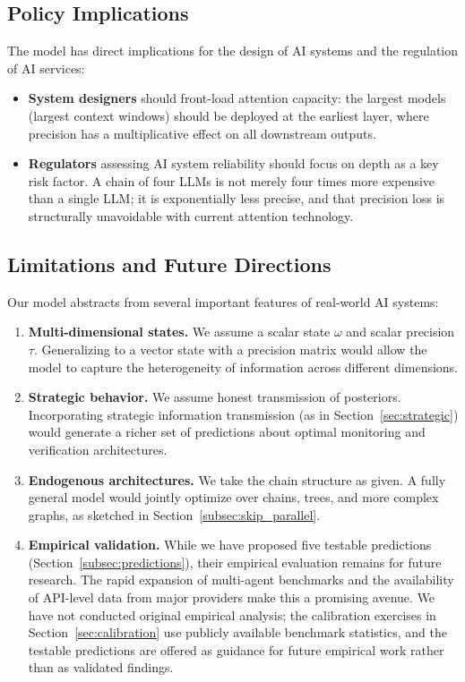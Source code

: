 \subsection{Policy Implications}

The model has direct implications for the design of AI systems and the regulation of AI services:

\begin{itemize}
\item \textbf{System designers} should front-load attention capacity: the largest models (largest context windows) should be deployed at the earliest layer, where precision has a multiplicative effect on all downstream outputs.
\item \textbf{Regulators} assessing AI system reliability should focus on depth as a key risk factor. A chain of four LLMs is not merely four times more expensive than a single LLM; it is exponentially less precise, and that precision loss is structurally unavoidable with current attention technology.
\end{itemize}

\subsection{Limitations and Future Directions}

Our model abstracts from several important features of real-world AI systems:

\begin{enumerate}
\item \textbf{Multi-dimensional states.} We assume a scalar state $\omega$ and scalar precision $\tau$. Generalizing to a vector state with a precision matrix would allow the model to capture the heterogeneity of information across different dimensions.
\item \textbf{Strategic behavior.} We assume honest transmission of posteriors. Incorporating strategic information transmission (as in Section~\ref{sec:strategic}) would generate a richer set of predictions about optimal monitoring and verification architectures.
\item \textbf{Endogenous architectures.} We take the chain structure as given. A fully general model would jointly optimize over chains, trees, and more complex graphs, as sketched in Section~\ref{subsec:skip_parallel}.
\item \textbf{Empirical validation.} While we have proposed five testable predictions (Section~\ref{subsec:predictions}), their empirical evaluation remains for future research. The rapid expansion of multi-agent benchmarks and the availability of API-level data from major providers make this a promising avenue. We have not conducted original empirical analysis; the calibration exercises in Section~\ref{sec:calibration} use publicly available benchmark statistics, and the testable predictions are offered as guidance for future empirical work rather than as validated findings.
\end{enumerate}


